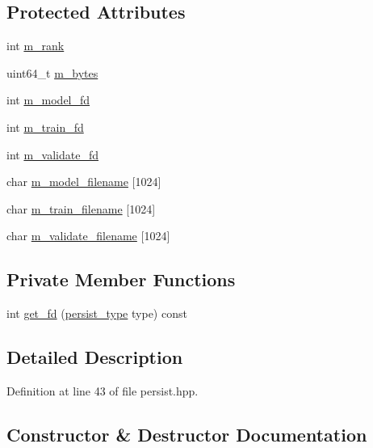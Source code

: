 \subsection*{Protected Attributes}
\begin{DoxyCompactItemize}
\item 
int \hyperlink{classlbann_1_1persist_aa99b1b0079bb10471472bf6f1d966deb}{m\+\_\+rank}
\item 
uint64\+\_\+t \hyperlink{classlbann_1_1persist_a0bd4fd42d9858a5210c8034dfbb666d4}{m\+\_\+bytes}
\item 
int \hyperlink{classlbann_1_1persist_a1adc7102c1b4bc91534ca156decbd965}{m\+\_\+model\+\_\+fd}
\item 
int \hyperlink{classlbann_1_1persist_a817671390811dde04670c47139402f51}{m\+\_\+train\+\_\+fd}
\item 
int \hyperlink{classlbann_1_1persist_a87927d03b0cf684023178f997c038783}{m\+\_\+validate\+\_\+fd}
\item 
char \hyperlink{classlbann_1_1persist_ac01cd3c8fe0f97c1312ca1a595f2f690}{m\+\_\+model\+\_\+filename} \mbox{[}1024\mbox{]}
\item 
char \hyperlink{classlbann_1_1persist_a417a443c894fd07472504936f5b02b62}{m\+\_\+train\+\_\+filename} \mbox{[}1024\mbox{]}
\item 
char \hyperlink{classlbann_1_1persist_a8ccf3728c62f825ec2f8cfe15929fc2a}{m\+\_\+validate\+\_\+filename} \mbox{[}1024\mbox{]}
\end{DoxyCompactItemize}
\subsection*{Private Member Functions}
\begin{DoxyCompactItemize}
\item 
int \hyperlink{classlbann_1_1persist_a0fe7bbf6a5a47417aa904d0cb64af3fd}{get\+\_\+fd} (\hyperlink{namespacelbann_adee41f31f15f3906cbdcce4a1417eb56}{persist\+\_\+type} type) const
\end{DoxyCompactItemize}


\subsection{Detailed Description}


Definition at line 43 of file persist.\+hpp.



\subsection{Constructor \& Destructor Documentation}
\mbox{\label{classlbann_1_1persist_abf1454f4d5b61617ccfa60ba9989f1a3}} 
